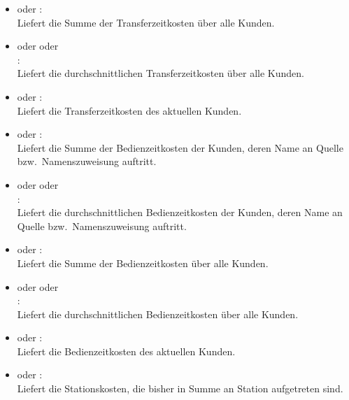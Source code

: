 \begin{itemize}
\item
{} oder :\\
Liefert die Summe der Transferzeitkosten über alle Kunden.

\item
{} oder  oder\\
:\\
Liefert die durchschnittlichen Transferzeitkosten über alle Kunden.

\item
{} oder :\\
Liefert die Transferzeitkosten des aktuellen Kunden.

\item
{} oder :\\
Liefert die Summe der Bedienzeitkosten der Kunden, deren Name an Quelle bzw.\ Namenszuweisung  auftritt.

\item
{} oder  oder\\
:\\
Liefert die durchschnittlichen Bedienzeitkosten der Kunden, deren Name an Quelle bzw.\ Namenszuweisung  auftritt.

\item
{} oder :\\
Liefert die Summe der Bedienzeitkosten über alle Kunden.

\item
{} oder  oder\\
:\\
Liefert die durchschnittlichen Bedienzeitkosten über alle Kunden.

\item
{} oder :\\
Liefert die Bedienzeitkosten des aktuellen Kunden.

\item
{} oder :\\
Liefert die Stationskosten, die bisher in Summe an Station  aufgetreten sind.


\end{itemize}
